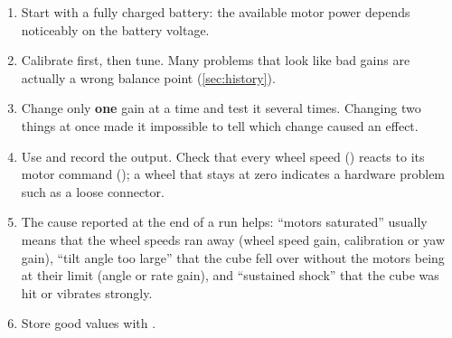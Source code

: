 \begin{enumerate}
  \item Start with a fully charged battery: the available motor power depends noticeably on the
        battery voltage.
  \item Calibrate first, then tune. Many problems that look like bad gains are actually a wrong
        balance point (\cref{sec:history}).
  \item Change only \textbf{one} gain at a time and test it several times. Changing two things at
        once made it impossible to tell which change caused an effect.
  \item Use  and record the output. Check that every wheel speed () reacts to
        its motor command (); a wheel that stays at zero indicates a hardware problem
        such as a loose connector.
  \item The cause reported at the end of a run helps: \enquote{motors saturated} usually means that
        the wheel speeds ran away (wheel speed gain, calibration or yaw gain),
        \enquote{tilt angle too large} that the cube fell over without the motors being at their
        limit (angle or rate gain), and \enquote{sustained shock} that the cube was hit or vibrates
        strongly.
  \item Store good values with .
\end{enumerate}
